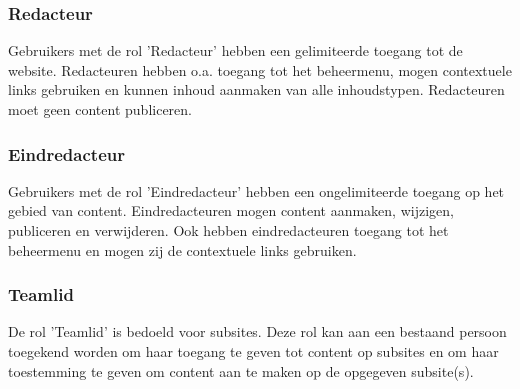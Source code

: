 \subsubsection{Redacteur}\label{redacteur}
Gebruikers met de rol 'Redacteur' hebben een gelimiteerde toegang tot de website. Redacteuren hebben o.a. toegang tot het beheermenu, mogen contextuele links gebruiken en kunnen inhoud aanmaken van alle inhoudstypen. Redacteuren moet geen content publiceren.

\subsubsection{Eindredacteur}\label{eindredacteur}
Gebruikers met de rol 'Eindredacteur' hebben een ongelimiteerde toegang op het gebied van content. Eindredacteuren mogen content aanmaken, wijzigen, publiceren en verwijderen. Ook hebben eindredacteuren toegang tot het beheermenu en mogen zij de contextuele links gebruiken.

\subsubsection{Teamlid}\label{teamlid}
De rol 'Teamlid' is bedoeld voor subsites. Deze rol kan aan een bestaand persoon toegekend worden om haar toegang te geven tot content op subsites en om haar toestemming te geven om content aan te maken op de opgegeven subsite(s).